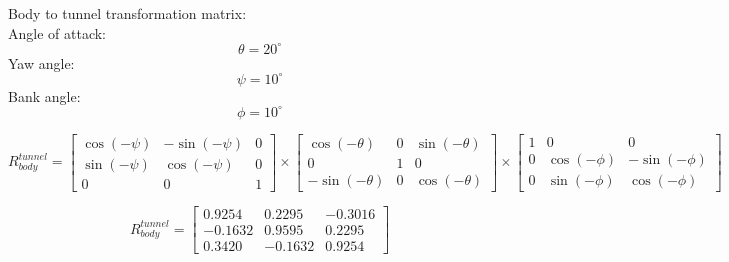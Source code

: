 Body to tunnel transformation matrix:
\\
Angle of attack:
$$\theta = 20^{\circ}$$
Yaw angle:
$$\psi = 10^{\circ}$$
Bank angle:
$$\phi = 10^{\circ}$$

$$R_{body}^{tunnel} = \begin{bmatrix}
	\cos(-\psi) & -\sin(-\psi) & 0 \\
	\sin(-\psi) & \cos(-\psi)  & 0 \\
	0          &     0       & 1
\end{bmatrix} \times
\begin{bmatrix}
	\cos(-\theta) & 0 & \sin(-\theta)   \\
		0      & 1  &       0 \\
	-\sin(-\theta) & 0 & \cos(-\theta)  

\end{bmatrix} \times
\begin{bmatrix}
		1      & 0 &         0     \\
	0 & \cos(-\phi) &  -\sin(-\phi)   \\

	0 &  \sin(-\phi) & \cos(-\phi)  
	
\end{bmatrix}  $$

$$R_{body}^{tunnel} = \begin{bmatrix}
	    0.9254  &  0.2295  & -0.3016 \\
		-0.1632  &  0.9595  &  0.2295 \\
		0.3420  & -0.1632  &  0.9254 \end{bmatrix}$$